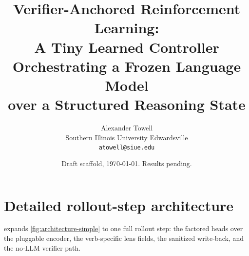 \documentclass[11pt,letterpaper]{article}
\title{Verifier-Anchored Reinforcement Learning:\\
A Tiny Learned Controller Orchestrating a Frozen Language Model\\
over a Structured Reasoning State}
\author{
  Alexander Towell\\
  Southern Illinois University Edwardsville\\
  \texttt{atowell@siue.edu}
}
\date{Draft scaffold, \today. Results pending.}
\begin{document}
\maketitle













\appendix
\section{Detailed rollout-step architecture}
\label{app:architecture}

 expands \cref{fig:architecture-simple} to one full rollout step: the factored heads over the pluggable encoder, the verb-specific lens fields, the sanitized write-back, and the no-LLM verifier path.





\end{document}
